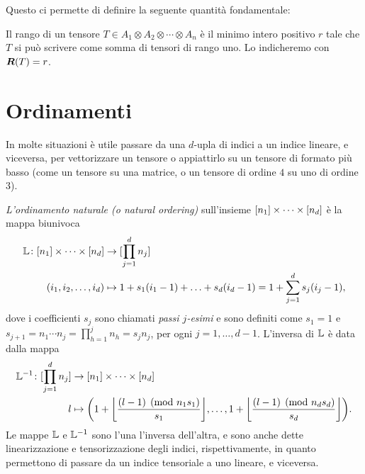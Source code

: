 Questo ci permette di definire la seguente quantità fondamentale:
\begin{definition}
	Il rango di un tensore $ T \in A_1 \otimes A_2 \otimes \cdots \otimes A_{n}$ è il minimo intero
	positivo $ r $ tale che $ T $ si può scrivere come somma di tensori di rango uno. Lo indicheremo con $ \bm{R}(T) = r $.
\end{definition}

\section{Ordinamenti}

In molte situazioni è utile passare da una $ d $-upla di indici a un indice lineare, e viceversa,
per vettorizzare un tensore o appiattirlo su un tensore di formato più basso (come un tensore su una
matrice, o un tensore di ordine $ 4 $ su uno di ordine $ 3 $).

\begin{definition}
	\emph{L'ordinamento naturale (o natural ordering)} sull'insieme $ \mdom! $ è la mappa biunivoca
	\begin{equation*}
		\begin{aligned}
			\L \colon \mdom! & \to [\prod_{j=1}^d n_j]                                                        \\
			(\miwc)          & \mapsto 1 + s_1 (i_1-1) + \ldots + s_d(i_d-1) = 1 + \sum_{j=1}^d s_j(i_j - 1),
		\end{aligned}
	\end{equation*}
	dove i coefficienti $ s_j $ sono chiamati \emph{passi $ j $-esimi} e sono definiti come $ s_1=1 $ e
	$ s_{j+1} = n_1 \cdots n_{j} = \prod_{h=1}^{j}n_h = s_jn_j$, per ogni $ j = 1, \ldots, d-1 $.
	L'inversa di $ \mathbb{L} $ è data dalla mappa
	\begin{equation*}
		\begin{aligned}
			\L^{-1} \colon [\prod_{j=1}^d n_j] & \to \mdom!                                                                               \\
			l                                  & \mapsto \left(1 + \left\lfloor \frac{ (l-1)\pmod{n_1s_1}}{s_1}\right\rfloor, \ldots, 1 +
			\left\lfloor \frac{ (l-1)\pmod{n_ds_d}}{s_d} \right\rfloor \right).
		\end{aligned}
	\end{equation*}
	Le mappe $ \mathbb{L} $ e $ \mathbb{L}^{-1} $ sono l'una l'inversa dell'altra, e sono anche dette linearizzazione e tensorizzazione
	degli indici, rispettivamente, in quanto permettono di passare da un indice tensoriale a uno
	lineare, e viceversa.
\end{definition}


